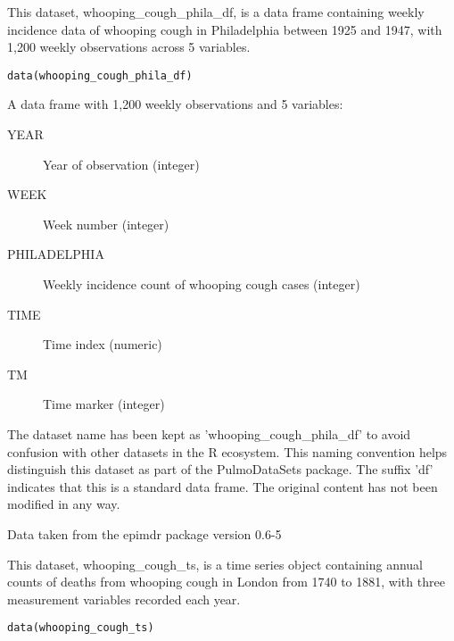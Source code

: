 \documentclass[a4paper]{book}
\begin{document}
%
\begin{Description}
This dataset, whooping\_cough\_phila\_df, is a data frame containing weekly incidence
data of whooping cough in Philadelphia between 1925 and 1947, with 1,200 weekly
observations across 5 variables.
\end{Description}
%
\begin{Usage}
\begin{verbatim}
data(whooping_cough_phila_df)
\end{verbatim}
\end{Usage}
%
\begin{Format}
A data frame with 1,200 weekly observations and 5 variables:
\begin{description}

\item[YEAR] Year of observation (integer)
\item[WEEK] Week number (integer)
\item[PHILADELPHIA] Weekly incidence count of whooping cough cases (integer)
\item[TIME] Time index (numeric)
\item[TM] Time marker (integer)

\end{description}

\end{Format}
%
\begin{Details}
The dataset name has been kept as 'whooping\_cough\_phila\_df' to avoid confusion with other
datasets in the R ecosystem. This naming convention helps distinguish this dataset
as part of the PulmoDataSets package. The suffix 'df' indicates that this is a
standard data frame. The original content has not been modified in any way.
\end{Details}
%
\begin{Source}
Data taken from the epimdr package version 0.6-5
\end{Source}
%
\begin{Description}
This dataset, whooping\_cough\_ts, is a time series object containing annual counts
of deaths from whooping cough in London from 1740 to 1881, with three measurement
variables recorded each year.
\end{Description}
%
\begin{Usage}
\begin{verbatim}
data(whooping_cough_ts)
\end{verbatim}
\end{Usage}
\end{document}
